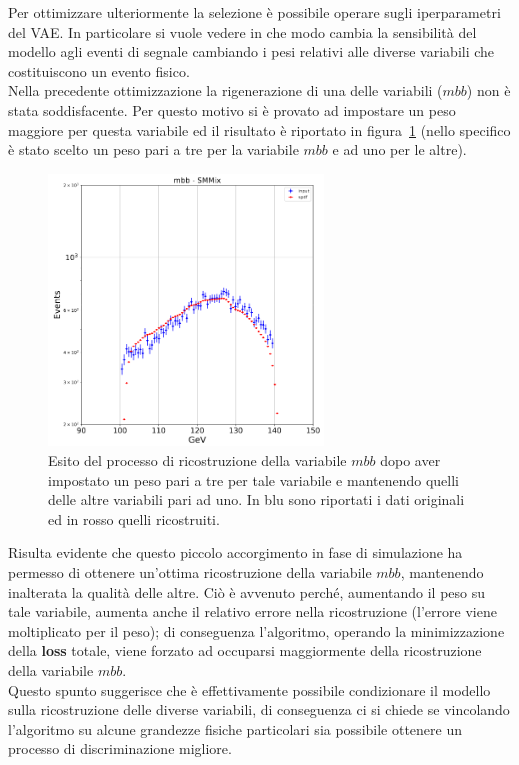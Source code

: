 Per ottimizzare ulteriormente la selezione è possibile operare sugli iperparametri del VAE. In particolare si vuole vedere in che modo cambia la sensibilità del modello agli eventi di segnale cambiando i pesi relativi alle diverse variabili che costituiscono un evento fisico.\\
Nella precedente ottimizzazione la rigenerazione di una delle variabili ($\textit{mbb}$) non è stata soddisfacente. Per questo motivo si è provato ad impostare un peso maggiore per questa variabile ed il risultato è riportato in figura~\ref{mbb_ottimizzazione} (nello specifico è stato scelto un peso pari a tre per la variabile $\textit{mbb}$ e ad uno per le altre).

\begin{figure}[h!]
	\centering
	\includegraphics[width=0.65\textwidth]{figs/risultati_simulazione/verifica_mbb.png}
	\caption{Esito del processo di ricostruzione della variabile $\textit{mbb}$ dopo aver impostato un peso pari a tre per tale variabile e mantenendo quelli delle altre variabili pari ad uno. In blu sono riportati i dati originali ed in rosso quelli ricostruiti.}
	\label{mbb_ottimizzazione}
\end{figure}

Risulta evidente che questo piccolo accorgimento in fase di simulazione ha permesso di ottenere un'ottima ricostruzione della variabile $\textit{mbb}$, mantenendo inalterata la qualità delle altre. Ciò è avvenuto perché, aumentando il peso su tale variabile, aumenta anche il relativo errore nella ricostruzione (l'errore viene moltiplicato per il peso); di conseguenza l'algoritmo, operando la minimizzazione della \textbf{loss} totale, viene forzato ad occuparsi maggiormente della ricostruzione della variabile $\textit{mbb}$. \\
Questo spunto suggerisce che è effettivamente possibile condizionare il modello sulla ricostruzione delle diverse variabili, di conseguenza ci si chiede se vincolando l'algoritmo su alcune grandezze fisiche particolari sia possibile ottenere un processo di discriminazione migliore.

